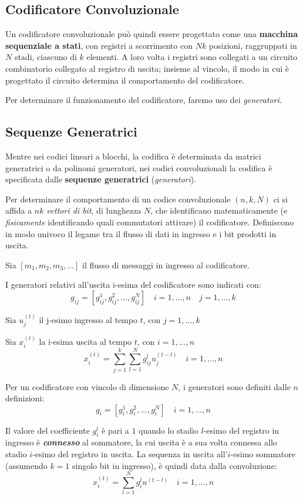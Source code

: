 \subsection{Codificatore Convoluzionale}
Un codificatore convoluzionale può quindi essere progettato come una \textbf{macchina sequenziale a stati}, con registri a scorrimento con $Nk$ posizioni, raggruppati in $N$ stadi, ciascuno di $k$ elementi. A loro volta i registri sono collegati a un circuito combinatorio collegato al registro di uscita; insieme al vincolo, il modo in cui è progettato il circuito determina il comportamento del codificatore.

Per determinare il funzionamento del codificatore, faremo uso dei \textit{generatori}.

\subsection{Sequenze Generatrici}
Mentre nei codici lineari a blocchi, la codifica è determinata da matrici generatrici o da polinomi generatori, nei codici convoluzionali la codifica è specificata dalle \textbf{sequenze generatrici} (\textit{generatori}).

Per determinare il comportamento di un codice convoluzionale $(n,k,N)$ ci si affida a $nk$ \textit{vettori di bit}, di lunghezza $N$, che identificano matematicamente (e \textit{fisicamente} identificando quali commutatori attivare) il codificatore. Definiscono in modo univoco il legame tra il flusso di dati in ingresso e i bit prodotti in uscita.

Sia $[m_1,m_2,m_3,\dots]$ il flusso di messaggi in ingresso al codificatore.

I generatori relativi all'uscita i-esima del codificatore sono indicati con:
\[ g_{ij}=[g_{ij}^1,g_{ij}^2,\dots,g_{ij}^N] \quad i=1,\dots,n \quad j=1,\dots,k\]

Sia $u_j^{(t)}$ il j-esimo ingresso al tempo $t$, con $j = 1,\dots , k$

Sia $x_i^{(t)}$ la i-esima uscita al tempo $t$, con $i = 1,\dots , n$
\[x_i^{(t)}= \sum_{j=1}^k\sum_{l=1}^N g_{ij}^lu_j^{(t-l)}\quad i=1,\dots,n\]


Per un codificatore con vincolo di dimensione $N$, i generatori sono definiti dalle $n$ definizioni:
\[g_i= [g_i^1,g_i^2,\dots,g_i^N]\quad i=1,\dots,n\]

Il valore del coefficiente $g_i^l$ è pari a $1$ quando lo stadio $l$-esimo del registro in ingresso è \textbf{\textit{connesso}} al sommatore, la cui uscita è a sua volta connessa allo stadio $i$-esimo del registro in uscita. La sequenza in uscita all'$i$-esimo sommatore (assumendo $k=1$ singolo bit in ingresso), è quindi data dalla convoluzione:
\[x_i^{(t)}= \sum_{l=1}^N g_i^{l}u^{(t-l)}\quad i=1,\dots, n\]

